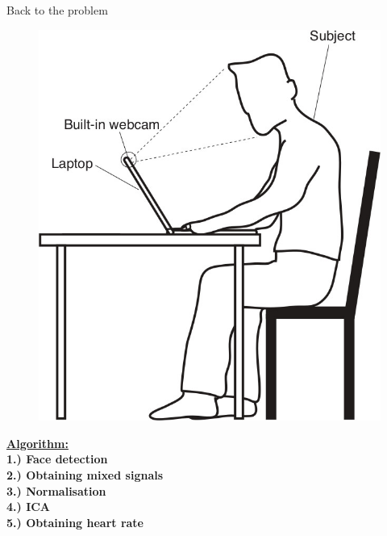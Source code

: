 \documentclass{beamer}
\begin{document}
\begin{frame}{Back to the problem}
\pause
\begin{figure}
	\includegraphics[height=0.4\paperheight]{setup_no_bvp.jpg}
\end{figure} \pause
\textbf{\Large \underline{Algorithm:}}\\
\vspace{0.2cm}
\textbf{\large 1.) Face detection}\\
\textbf{\large 2.) Obtaining mixed signals}\\
\textbf{\large 3.) Normalisation}\\
\textbf{\large 4.) ICA}\\
\textbf{\large 5.) Obtaining heart rate}
\end{frame}
\end{document}
